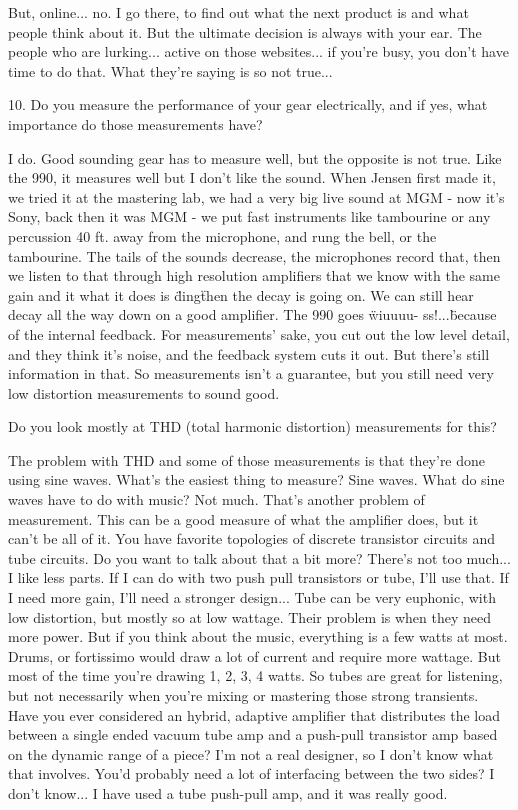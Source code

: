 But, online... no. I go there, to find out what the next product is and what people think about it. But the ultimate decision is always with your ear. The people who are lurking... active on those websites... if you're busy, you don't have time to do that. What they're saying is so not true...

10. Do you measure the performance of your gear electrically, and if yes, what importance do those measurements have?

I do. Good sounding gear has to measure well, but the opposite is not true. Like the 990, it measures well but I don't like the sound. When Jensen first made it, we tried it at the mastering lab, we had a very big live sound at MGM - now it's Sony, back then it was MGM - we put fast instruments like tambourine or any percussion 40 ft. away from the microphone, and rung the bell, or the tambourine. The tails of the sounds decrease, the microphones record that, then we listen to that through high resolution amplifiers that we know with the same gain and it what it does is \"ding\" then the decay is going on. We can still hear decay all the way down on a good amplifier. The 990 goes \"wiuuuu- ss!...\" because of the internal feedback. For measurements' sake, you cut out the low level detail, and they think it's noise, and the feedback system cuts it out. But there's still information in that. So measurements isn't a guarantee, but you still need very low distortion measurements to sound good.

Do you look mostly at THD (total harmonic distortion) measurements for this?

The problem with THD and some of those measurements is that they're done using sine waves. What's the easiest thing to measure? Sine waves. What do sine waves have to do with music? Not much. That's another problem of measurement. This can be a good measure of what the amplifier does, but it can't be all of it.
You have favorite topologies of discrete transistor circuits and tube circuits. Do you want to talk about that a bit more?
There's not too much... I like less parts. If I can do with two push pull transistors or tube, I'll use that. If I need more gain, I'll need a stronger design... Tube can be very euphonic, with low distortion, but mostly so at low wattage. Their problem is when they need more power. But if you think about the music, everything is a few watts at most. Drums, or fortissimo would draw a lot of current and require more wattage. But most of the time you're drawing 1, 2, 3, 4 watts. So tubes are great for listening, but not necessarily when you're mixing or mastering those strong transients.
Have you ever considered an hybrid, adaptive amplifier that distributes the load between a single ended vacuum tube amp and a push-pull transistor amp based on the dynamic range of a piece?
I'm not a real designer, so I don't know what that involves. You'd probably need a lot of interfacing between the two sides? I don't know... I have used a tube push-pull amp, and it was really good.

